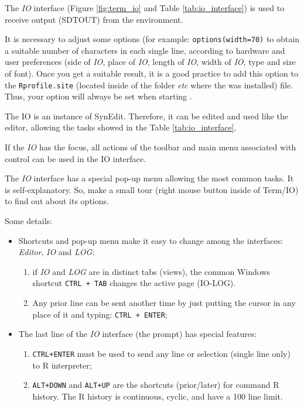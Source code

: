 The \textit{IO} interface
(Figure \ref{fig:term_io} and
Table \ref{tab:io_interface})
is used to receive output (SDTOUT) from the \RR{} environment.

It is necessary to adjust some \RR{} options (for example: \texttt{options(width=70)}
to obtain a suitable number of characters in each single line, according to
hardware and user preferences (side of \textit{IO}, place of \textit{IO},
length of \textit{IO}, width of \textit{IO}, type and size of font). Once
you get a suitable result, it is a good practice to add this option to the
\texttt{Rprofile.site} (located inside of the folder \textit{etc} where the
\RR{} was installed) file. Thus, your option will always be set when
starting \RR{}.

The IO is an instance of SynEdit. Therefore, it can be edited and used like
the editor, allowing the tasks showed in the
Table \ref{tab:io_interface}.

If the \textit{IO} has the focus, all actions of the \RR{} toolbar and main menu
associated with control \RR{} can be used in the IO interface.

The \textit{IO} interface has a special pop-up menu allowing the most common
tasks. It is self-explanatory. So, make a small tour (right mouse button inside
of Term/IO) to find out about its options.

Some details:

\begin{itemize}
  \item Shortcuts and pop-up menu make it easy to change among the interfaces:
    \textit{Editor}, \textit{IO} and \textit{LOG}:
    \begin{enumerate}
      \item if \textit{IO} and \textit{LOG} are in distinct tabs (views), the
        common Windows shortcut \texttt{CTRL + TAB} changes the active page (IO-LOG).
      \item Any prior line can be sent another time by just putting the cursor
        in any place of it and typing: \texttt{CTRL + ENTER};
    \end{enumerate}
  \item The last line of the \textit{IO} interface (the prompt) has special features:
    \begin{enumerate}
      \item \texttt{CTRL+ENTER} must be used to send any line or selection (single line only) to R interpreter;
      \item \texttt{ALT+DOWN} and \texttt{ALT+UP} are the shortcuts (prior/later)
        for command R history. The R history is continuous, cyclic, and have a 100
        line limit.
    \end{enumerate}
\end{itemize}


